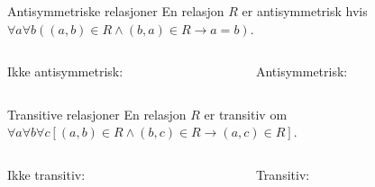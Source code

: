\begin{frame}[fragile]{Antisymmetriske relasjoner}
En relasjon $R$ er antisymmetrisk hvis $\forall a \forall b ((a, b) \in R \land (b, a) \in R \rightarrow a = b)$.\\
    \begin{columns}
        \begin{column}{0.3\textwidth}
        Ikke antisymmetrisk:
        \end{column}
        \pause
        \begin{column}{0.3\textwidth}
Antisymmetrisk:
        \end{column}
    \end{columns}
\end{frame}

\begin{frame}[fragile]{Transitive relasjoner}
En relasjon $R$ er transitiv om $\forall a \forall b \forall c [(a, b) \in R \land (b, c) \in R \rightarrow (a, c) \in R]$.\\
    \begin{columns}
        \begin{column}{0.3\textwidth}
        Ikke transitiv:
        \end{column}
        \pause
        \begin{column}{0.3\textwidth}
Transitiv:
        \end{column}
    \end{columns}
\end{frame}

